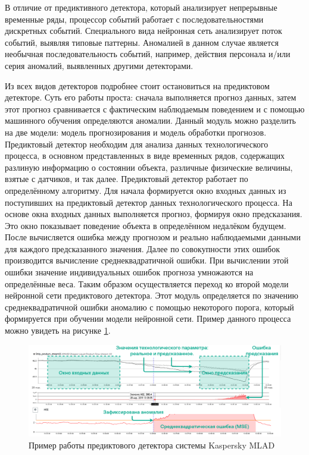 В отличие от предиктивного детектора, который анализирует непрерывные временные ряды, процессор событий работает с последовательностями дискретных событий. Специального вида нейронная сеть анализирует поток событий, выявляя типовые паттерны. Аномалией в данном случае является необычная последовательность событий, например, действия персонала и/или серия аномалий, выявленных другими детекторами.

Из всех видов детекторов подробнее стоит остановиться на предиктовом детекторе. Суть его работы проста: сначала выполняется прогноз данных, затем этот прогноз сравнивается с фактическим наблюдаемым поведением и с помощью машинного обучения определяются аномалии. Данный модуль можно разделить на две модели: модель прогнозирования и модель обработки прогнозов. Предиктовый детектор необходим для анализа данных технологического процесса, в основном представленных в виде временных рядов, содержащих разлиную информацию о состоянии объекта, различные физические величины, взятые с датчиков, и так далее. Предиктовый детектор работает по определённому алгоритму. Для начала формируется окно входных данных из поступивших на предиктовый детектор данных технологического процесса. На основе окна входных данных выполняется прогноз, формируя окно предсказания. Это окно показывает поведение объекта в определённом недалёком будущем. После вычисляется ошибка между прогнозом и реально наблюдаемыми данными для каждого предсказанного значения. Далее по совокупности этих ошибок производится вычисление среднеквадратичной ошибки. При вычислении этой ошибки значение индивидуальных ошибок прогноза умножаются на определённые веса. Таким образом осуществляется переход ко второй модели нейронной сети предиктового детектора. Этот модуль определяется по значению среднеквадратичной ошибки аномалию с помощью некоторого порога, который формируется при обучении модели нейронной сети. Пример данного процесса можно увидеть на рисунке \ref {fig:MLADex}.

\begin{figure}[H]
    \centering
    \includegraphics{images/chapter_3/MLAD_пример.png}
    \caption{Пример работы предиктового детектора системы Kaspersky MLAD}
    \label{fig:MLADex}
\end{figure}
